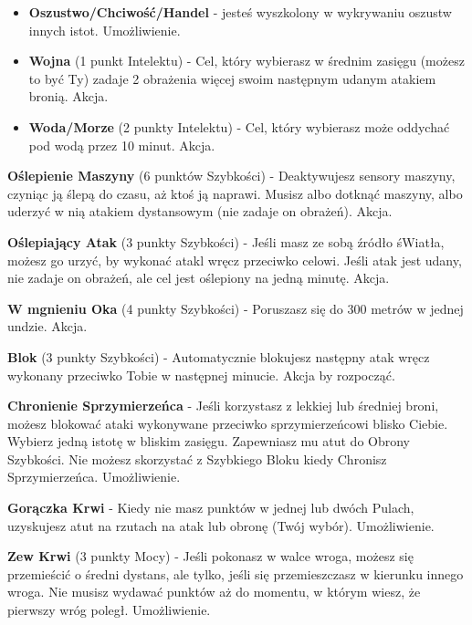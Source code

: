 \begin{itemize}
\item \textbf{Oszustwo/Chciwość/Handel} - jesteś wyszkolony w wykrywaniu oszustw innych istot. Umożliwienie. 
\item \textbf{Wojna} (1 punkt Intelektu) - Cel, który wybierasz w średnim zasięgu (możesz to być Ty) zadaje 2 obrażenia więcej swoim następnym udanym atakiem bronią. Akcja.
\item \textbf{Woda/Morze} (2 punkty Intelektu) - Cel, który wybierasz może oddychać pod wodą przez 10 minut. Akcja.
\end{itemize}

\textbf{Oślepienie Maszyny}\label{sec:Oślepienie Maszyny} (6 punktów Szybkości) - Deaktywujesz sensory maszyny, czyniąc ją ślepą do czasu, aż ktoś ją naprawi. Musisz albo dotknąć maszyny, albo uderzyć w nią atakiem dystansowym (nie zadaje on obrażeń). Akcja.

\textbf{Oślepiający Atak}\label{sec:Oślepiający Atak} (3 punkty Szybkości) - Jeśli masz ze sobą źródło śWiatła, możesz go urzyć, by wykonać atakl wręcz przeciwko celowi. Jeśli atak jest udany, nie zadaje on obrażeń, ale cel jest oślepiony na jedną minutę. Akcja.

\textbf{W mgnieniu Oka}\label{sec:W Mgnieniu Oka} (4 punkty Szybkości) - Poruszasz się do 300 metrów w jednej undzie. Akcja.

\textbf{Blok}\label{sec:Blok} (3 punkty Szybkości) - Automatycznie blokujesz następny atak wręcz wykonany przeciwko Tobie w następnej minucie. Akcja by rozpocząć. 

\textbf{Chronienie Sprzymierzeńca}\label{sec:Chronienie Sprzymierzeńca} - Jeśli korzystasz z lekkiej lub średniej broni, możesz blokować ataki wykonywane przeciwko sprzymierzeńcowi blisko Ciebie. Wybierz jedną istotę w bliskim zasięgu. Zapewniasz mu atut do Obrony Szybkości. Nie możesz skorzystać z Szybkiego Bloku kiedy Chronisz Sprzymierzeńca. Umożliwienie.

\textbf{Gorączka Krwi}\label{sec:Gorączka Krwi} - Kiedy nie masz punktów w jednej lub dwóch Pulach, uzyskujesz atut na rzutach na atak lub obronę (Twój wybór). Umożliwienie.

\textbf{Zew Krwi}\label{sec:Zew Krwi} (3 punkty Mocy) - Jeśli pokonasz w walce wroga, możesz się przemieścić o średni dystans, ale tylko, jeśli się przemieszczasz w kierunku innego wroga. Nie musisz wydawać punktów aż do momentu, w którym wiesz, że pierwszy wróg poległ. Umożliwienie.

